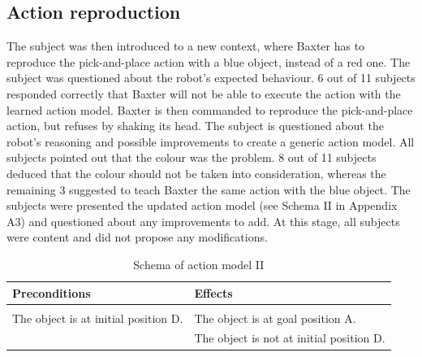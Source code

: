\subsection{Action reproduction}
The subject was then introduced to a new context, where Baxter has to reproduce the pick-and-place action with a blue object, instead of a red one. The subject was questioned about the robot's expected behaviour. 6 out of 11 subjects responded correctly that Baxter will not be able to execute the action with the learned action model.
Baxter is then commanded to reproduce the pick-and-place action, but refuses by shaking its head. The subject is questioned about the robot's reasoning and possible improvements to create a generic action model. All subjects pointed out that the colour was the problem. 8 out of 11 subjects deduced that the colour should not be taken into consideration, whereas the remaining 3 suggested to teach Baxter the same action with the blue object. The subjects were presented the updated action model (see Schema II in Appendix A3) and questioned about any improvements to add. At this stage, all subjects were content and did not propose any modifications.
\begin{table}[h]
	\begin{center}
		\begin{tabular}{l|l}
			Preconditions & Effects\\ \hline
			& \\
			The object is at initial position D. & The object is at goal position A.\\
			& The object is not at initial position D.
		\end{tabular}
	\end{center}
	\label{tab:schema2}
	\caption{Schema of action model II}
\end{table}

